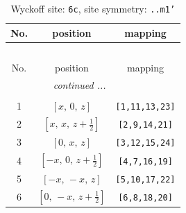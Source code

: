 \documentclass[fleqn,8pt]{jsarticle}
\begin{document}
\renewcommand{\arraystretch}{1.2}
\begin{longtable}{ccc}
\caption{Wyckoff site: {\tt 6c}, site symmetry: {\tt ..m1'}}
 \\
 \hline \hline
No. & position & mapping \\ \hline \endfirsthead

\multicolumn{2}{l}{\tablename\ \thetable{}} \\
 \hline \hline
No. & position & mapping \\ \hline \endhead

 \hline \hline
\multicolumn{2}{r}{\footnotesize\it continued ...} \\ \endfoot

 \hline \hline
\multicolumn{2}{r}{} \\ \endlastfoot

1 & $\left[ x,\, 0,\, z \right]$ & {\tt [1,11,13,23]} \\ \hline
2 & $\left[ x,\, x,\, z + \frac{1}{2} \right]$ & {\tt [2,9,14,21]} \\ \hline
3 & $\left[ 0,\, x,\, z \right]$ & {\tt [3,12,15,24]} \\ \hline
4 & $\left[ - x,\, 0,\, z + \frac{1}{2} \right]$ & {\tt [4,7,16,19]} \\ \hline
5 & $\left[ - x,\, - x,\, z \right]$ & {\tt [5,10,17,22]} \\ \hline
6 & $\left[ 0,\, - x,\, z + \frac{1}{2} \right]$ & {\tt [6,8,18,20]} \\
\end{longtable}
\renewcommand{\arraystretch}{1.2}
\end{document}
